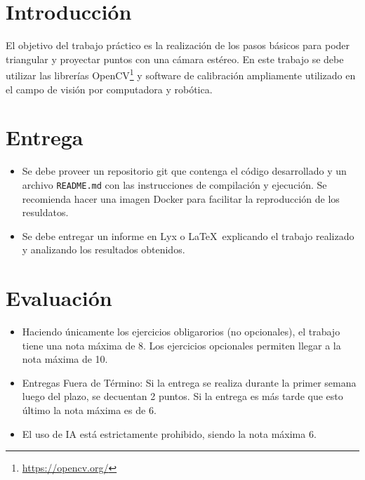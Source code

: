 \documentclass[tp]{lcc}
\begin{document}
\maketitle

\section{Introducción}

El objetivo del trabajo práctico es la realización de los pasos básicos para poder triangular y proyectar puntos con una cámara estéreo. En este trabajo se debe utilizar  las librerías OpenCV\footnote{\url{https://opencv.org/}} y software de calibración ampliamente utilizado en el campo de visión por computadora y robótica.


\section{Entrega}
\begin{itemize}
	\item Se debe proveer un repositorio git que contenga el código desarrollado y un archivo \lstinline{README.md} con las instrucciones de compilación y ejecución. Se recomienda hacer una imagen Docker para facilitar la reproducción de los resuldatos.
    
	\item Se debe entregar un informe en Lyx o \LaTeX\  explicando el trabajo realizado y analizando los resultados obtenidos.
\end{itemize}

\section{Evaluación}
\begin{itemize}
    \item Haciendo únicamente los ejercicios obligarorios (no opcionales), el trabajo tiene una nota máxima de 8. Los ejercicios opcionales permiten llegar a la nota máxima de 10.

    \item Entregas Fuera de Término: Si la entrega se realiza durante la primer semana luego del plazo, se decuentan 2 puntos. Si la entrega es más tarde que esto último la nota máxima es de 6.
    
    \item El uso de IA está estrictamente prohibido, siendo la nota máxima 6.
\end{itemize}
\end{document}
